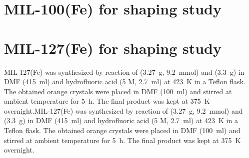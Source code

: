 \section{MIL-100(Fe) for shaping study}%
\label{appx:synthesis:mil100shaping}

\section{MIL-127(Fe) for shaping study}%
\label{appx:synthesis:mil127shaping}

MIL-127(Fe) was synthesized by reaction of
 (\SI{3.27}{\gram}, \SI{9.2}{\milli\mol}) and 
 (\SI{3.3}{\gram}) in DMF
(\SI{415}{\milli\litre}) and hydrofluoric acid (5 M, \SI{2.7}{\milli\litre}) at 
\SI{423}{\kelvin} in a Teflon
flask. The obtained orange crystals were placed in DMF (\SI{100}{\milli\litre})
and stirred at ambient temperature for \SI{5}{\hour}. The final product was
kept at \SI{375}{\kelvin} overnight.MIL-127(Fe) was synthesized by reaction of
 (\SI{3.27}{\gram}, \SI{9.2}{\milli\mol}) and 
 (\SI{3.3}{\gram}) in DMF
(\SI{415}{\milli\litre}) and hydrofluoric acid (5 M, \SI{2.7}{\milli\litre}) at 
\SI{423}{\kelvin} in a Teflon 
flask. The obtained orange crystals were placed in DMF (\SI{100}{\milli\litre})
and stirred at ambient temperature for \SI{5}{\hour}. The final product was
kept at \SI{375}{\kelvin} overnight.